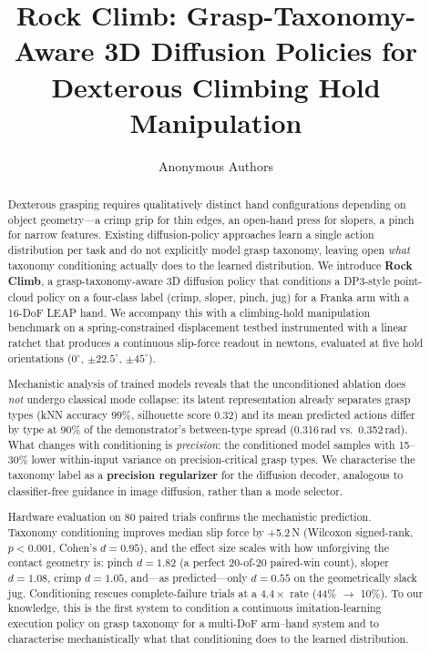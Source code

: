 \documentclass[11pt]{article}
\title{Rock Climb: Grasp-Taxonomy-Aware 3D Diffusion Policies for Dexterous Climbing Hold Manipulation}
\author{Anonymous Authors}
\date{}
\begin{document}
\maketitle

\begin{abstract}
Dexterous grasping requires qualitatively distinct hand configurations depending on
object geometry---a crimp grip for thin edges, an open-hand press for slopers, a
pinch for narrow features. Existing diffusion-policy approaches learn a single action
distribution per task and do not explicitly model grasp taxonomy, leaving open
\emph{what} taxonomy conditioning actually does to the learned distribution.
We introduce \textbf{Rock Climb}, a grasp-taxonomy-aware 3D diffusion policy that
conditions a DP3-style point-cloud policy on a four-class label (crimp, sloper, pinch,
jug) for a Franka arm with a 16-DoF LEAP hand. We accompany this with a climbing-hold
manipulation benchmark on a spring-constrained displacement testbed instrumented with
a linear ratchet that produces a continuous slip-force readout in newtons, evaluated
at five hold orientations ($0^\circ$, $\pm 22.5^\circ$, $\pm 45^\circ$).

Mechanistic analysis of trained models reveals that the unconditioned ablation does
\emph{not} undergo classical mode collapse: its latent representation already separates
grasp types (kNN accuracy 99\%, silhouette score 0.32) and its mean predicted actions
differ by type at 90\% of the demonstrator's between-type spread (0.316\,rad vs.\
0.352\,rad). What changes with conditioning is \emph{precision}: the conditioned model
samples with 15--30\% lower within-input variance on precision-critical grasp types.
We characterise the taxonomy label as a \textbf{precision regularizer} for the
diffusion decoder, analogous to classifier-free guidance in image diffusion, rather
than a mode selector.

Hardware evaluation on 80 paired trials confirms the mechanistic prediction.
Taxonomy conditioning improves median slip force by +5.2\,N
(Wilcoxon signed-rank, $p < 0.001$, Cohen's $d = 0.95$), and the effect size
scales with how unforgiving the contact geometry is: pinch $d = 1.82$ (a perfect
20-of-20 paired-win count), sloper $d = 1.08$, crimp $d = 1.05$, and---as
predicted---only $d = 0.55$ on the geometrically slack jug. Conditioning rescues
complete-failure trials at a $4.4\times$ rate (44\% $\to$ 10\%). To our knowledge,
this is the first system to condition a continuous imitation-learning execution policy
on grasp taxonomy for a multi-DoF arm--hand system and to characterise mechanistically
what that conditioning does to the learned distribution.
\end{abstract}
\end{document}
